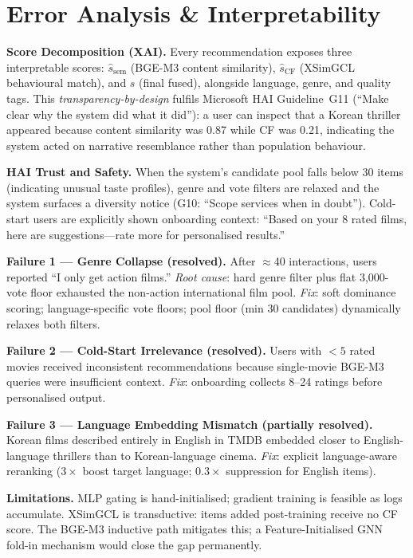 \documentclass[conference]{IEEEtran}
\begin{document}
\section{Error Analysis \& Interpretability}
\label{sec:erroranalysis}

\textbf{Score Decomposition (XAI).}
Every recommendation exposes three interpretable scores:
$\hat{s}_\text{sem}$ (BGE-M3 content similarity),
$\hat{s}_\text{CF}$ (XSimGCL behavioural match), and
$s$ (final fused), alongside language, genre, and quality tags.
This \emph{transparency-by-design} fulfils Microsoft HAI Guideline~G11
(``Make clear why the system did what it did''):
a user can inspect that a Korean thriller appeared because content
similarity was 0.87 while CF was 0.21, indicating the system acted on
narrative resemblance rather than population behaviour.

\textbf{HAI Trust and Safety.}
When the system's candidate pool falls below 30 items (indicating
unusual taste profiles), genre and vote filters are relaxed and the
system surfaces a diversity notice (G10: ``Scope services when in doubt'').
Cold-start users are explicitly shown onboarding context:
``Based on your 8 rated films, here are suggestions---rate more for
personalised results.''

\textbf{Failure 1 --- Genre Collapse (resolved).}
After $\approx$40 interactions, users reported ``I only get action films.''
\emph{Root cause}: hard genre filter plus flat 3,000-vote floor exhausted
the non-action international film pool.
\emph{Fix}: soft dominance scoring; language-specific vote floors; pool
floor (min 30 candidates) dynamically relaxes both filters.

\textbf{Failure 2 --- Cold-Start Irrelevance (resolved).}
Users with $<5$ rated movies received inconsistent recommendations
because single-movie BGE-M3 queries were insufficient context.
\emph{Fix}: onboarding collects 8--24 ratings before personalised output.

\textbf{Failure 3 --- Language Embedding Mismatch (partially resolved).}
Korean films described entirely in English in TMDB embedded closer to
English-language thrillers than to Korean-language cinema.
\emph{Fix}: explicit language-aware reranking ($3\times$ boost target
language; $0.3\times$ suppression for English items).

\textbf{Limitations.}
MLP gating is hand-initialised; gradient training is feasible as logs
accumulate.
XSimGCL is transductive: items added post-training receive no CF score.
The BGE-M3 inductive path mitigates this; a Feature-Initialised GNN
fold-in mechanism would close the gap permanently.
\end{document}
